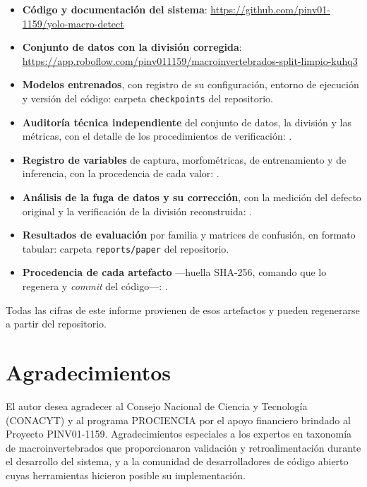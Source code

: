 \documentclass[onecolumn]{article}
\begin{document}
\begin{itemize}
    \item \textbf{Código y documentación del sistema}: \url{https://github.com/pinv01-1159/yolo-macro-detect}
    \item \textbf{Conjunto de datos con la división corregida}: \url{https://app.roboflow.com/pinv011159/macroinvertebrados-split-limpio-kuhq3}
    \item \textbf{Modelos entrenados}, con registro de su configuración, entorno de ejecución y versión del código: carpeta \texttt{checkpoints} del repositorio.
    \item \textbf{Auditoría técnica independiente} del conjunto de datos, la división y las métricas, con el detalle de los procedimientos de verificación: .
    \item \textbf{Registro de variables} de captura, morfométricas, de entrenamiento y de inferencia, con la procedencia de cada valor: .
    \item \textbf{Análisis de la fuga de datos y su corrección}, con la medición del defecto original y la verificación de la división reconstruida: .
    \item \textbf{Resultados de evaluación} por familia y matrices de confusión, en formato tabular: carpeta \texttt{reports/paper} del repositorio.
    \item \textbf{Procedencia de cada artefacto} ---huella SHA-256, comando que lo regenera y \emph{commit} del código---: .
\end{itemize}

Todas las cifras de este informe provienen de esos artefactos y pueden regenerarse a partir del repositorio.

\section*{Agradecimientos}

El autor desea agradecer al Consejo Nacional de Ciencia y Tecnología (CONACYT) y al programa PROCIENCIA por el apoyo financiero brindado al Proyecto PINV01-1159. Agradecimientos especiales a los expertos en taxonomía de macroinvertebrados que proporcionaron validación y retroalimentación durante el desarrollo del sistema, y a la comunidad de desarrolladores de código abierto cuyas herramientas hicieron posible su implementación.
\end{document}
